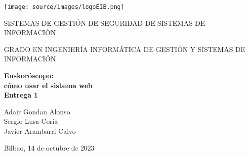 
\begin{center}

\texttt{[image: source/images/logoEIB.png]} 




\vspace*{2cm}
\begin{Large}
SISTEMAS DE GESTIÓN DE SEGURIDAD DE SISTEMAS DE INFORMACIÓN
\end{Large}

\vspace*{1cm}
\begin{Large}
GRADO EN INGENIERÍA INFORMÁTICA DE GESTIÓN Y SISTEMAS DE INFORMACIÓN
\end{Large}

\vspace*{2.5cm}

\textbf{\huge Euskoróscopo:\\ cómo usar el sistema web}\\
\vspace{1cm}
\textbf{\huge Entrega 1}%


\vspace*{1.5cm}

{\Large Adair Gondan Alonso\\Sergio Lusa Coria\\Javier Arambarri Calvo} %



\vspace*{1.5cm}

Bilbao, 14 de octubre de 2023\\


\end{center}